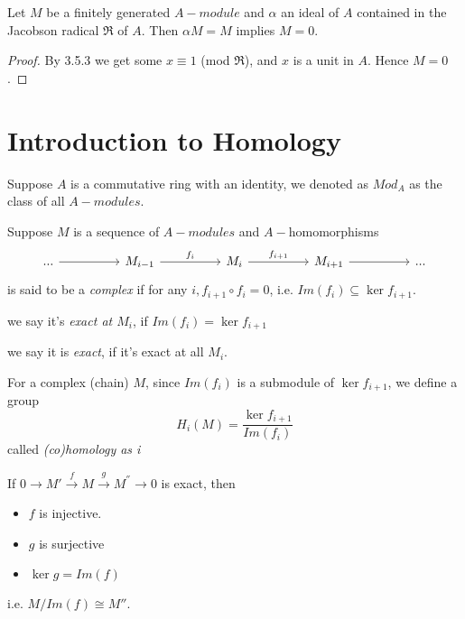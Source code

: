 \documentclass[11pt,fleqn]{book} %
\begin{document}
\begin{CJK}{UTF8}{gkai}
\begin{theorem}
	 Let $M$ be a finitely generated $A-module$ and $\alpha$ an ideal of $A$ contained in the Jacobson radical $\mathfrak{R}$ of $A$. Then $\alpha M = M$ implies $M = 0$.
\end{theorem}
\begin{proof}
	By 3.5.3 we get some $x \equiv 1$ (mod $\mathfrak R$), and $x$ is a unit in $A$. Hence $M = 0$.
\end{proof}


\chapter{Introduction to Homology}

\begin{definition}
	 Suppose $A$ is a commutative ring with an identity, we denoted as $Mod_A$ as the class of all $A-modules$.
\end{definition}

\begin{definition}
	 Suppose $M$ is a sequence of $A-modules$ and $A-$homomorphisms
	\[\begin{tikzcd}
		{...} && {M_{i-1}} && {M_i} && {M_{i+1}} && {...}
		\arrow[from=1-1, to=1-3]
		\arrow["{f_i}", from=1-3, to=1-5]
		\arrow["{f_{i+1}}", from=1-5, to=1-7]
		\arrow[from=1-7, to=1-9]
	\end{tikzcd}\]
	is said to be a {\it complex} if for any $i, f_{i+1}\circ f_i = 0$, i.e. $Im(f_i)\subseteq \ker f_{i+1}$. 

	we say it's {\it exact at $M_i$}, if $Im (f_i) = \ker f_{i+1}$
	
	we say it is {\it exact}, if it's exact at all $M_i$.
\end{definition}

\begin{definition}
	 For a complex (chain) $M$, since $Im(f_i)$ is a submodule of $\ker f_{i+1}$, we define a group 
	\[H_i(M) = \frac {\ker f_{i+1}} {Im (f_i)}\]
	called {\it (co)homology as i}
\end{definition}

\begin{example}
	If $0 \xrightarrow{} M' \xrightarrow{f} M \xrightarrow{g} M^{''}\xrightarrow{}0$ is exact, then 
	\begin{itemize}
		\item $f$ is injective.
		\item $g$ is surjective
		\item $\ker g = Im (f)$
	\end{itemize}
	i.e. $M / Im (f) \cong M''$.
\end{example}


\end{CJK}
\end{document}
